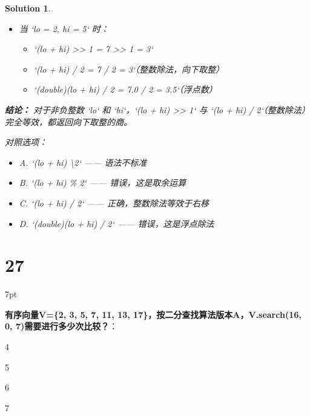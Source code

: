 \documentclass[UTF8]{report}
\newtheorem{solution}{Solution}
\theoremstyle{MyLineTheoremStyle} %
\theoremstyle{MyBlockTheoremStyle} %
\theoremstyle{MySubsubsectionStyle} %
\newenvironment{graybox}{%
        \def\FrameCommand{%
        \hspace{1pt}%
        {\color{gray}\small \vrule width 2pt}%
        {\color{graybox_color}\vrule width 4pt}%
        \colorbox{graybox_color}%
        }%
        \MakeFramed{\advance\hsize-\width\FrameRestore}%
        \noindent\hspace{-4.55pt}%
        \begin{adjustwidth}{}{7pt}%
        \vspace{2pt}\vspace{2pt}%
        }
        {%
        \vspace{2pt}\end{adjustwidth}\endMakeFramed%
        }
\begin{document}
\begin{solution}
\begin{itemize}
    \item 当 `lo = 2, hi = 5` 时：
    \begin{itemize}
        \item `(lo + hi) >> 1 = 7 >> 1 = 3`
        \item `(lo + hi) / 2 = 7 / 2 = 3`（整数除法，向下取整）
        \item `(double)(lo + hi) / 2 = 7.0 / 2 = 3.5`（浮点数）
    \end{itemize}
\end{itemize}

\textbf{结论：}
对于非负整数 `lo` 和 `hi`，`(lo + hi) >> 1` 与 `(lo + hi) / 2`（整数除法）完全等效，都返回向下取整的商。

对照选项：
\begin{itemize}
    \item A. `(lo + hi) \textbackslash 2` —— 语法不标准
    \item B. `(lo + hi) \% 2` —— 错误，这是取余运算
    \item C. `(lo + hi) / 2` —— 正确，整数除法等效于右移
    \item D. `(double)(lo + hi) / 2` —— 错误，这是浮点除法
\end{itemize}
\end{solution}

\section*{27}

\begin{graybox}
\textbf{有序向量V=\{2, 3, 5, 7, 11, 13, 17\}，按二分查找算法版本A，V.search(16, 0, 7)需要进行多少次比较？}：
\begin{circledenum}
    \item 4
    \item 5
    \item 6
    \item 7
\end{circledenum}
\end{graybox}
\end{document}
